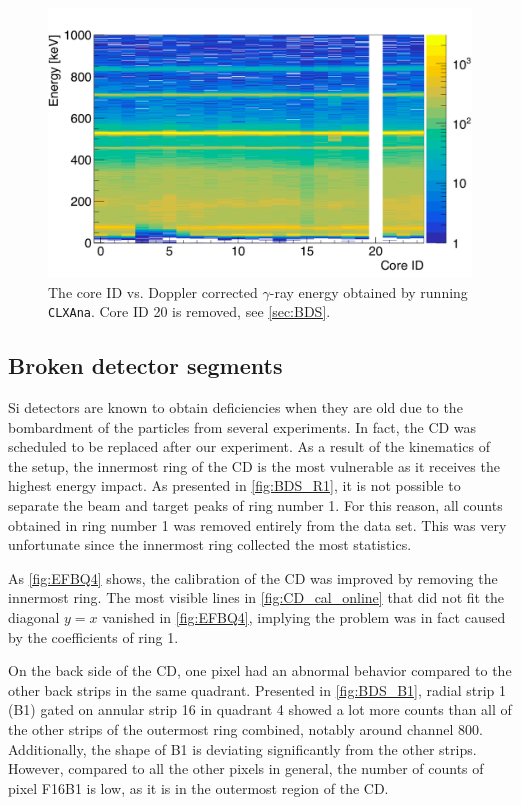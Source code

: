 \documentclass[twoside,english]{uiofysmaster/uiofysmaster}
\newcommand{\ga}{$\gamma$}
\let\orgautoref\autoref
\renewcommand{\autoref}
        {%
		 \def\sectionautorefname{Section}%
		 \def\subsectionautorefname{Section}%
		 \def\subsubsectionautorefname{Section}%
		 \def\chapterautorefname{Chapter}%
          \orgautoref}
\begin{document}
\begin{figure}[ht]
	\centering
	\includegraphics[width=\textwidth]{../Plots/plotting/B_dcB_cid.png}
	\caption{The core ID vs. Doppler corrected \ga-ray energy obtained by running \texttt{CLXAna}. 
	Core ID 20 is removed, see \autoref{sec:BDS}.}
	\label{fig:B_dcB_cid}
\end{figure}


\subsection{Broken detector segments}\label{sec:BDS}
Si detectors are known to obtain deficiencies when they are old due to the bombardment of the particles from several experiments.
In fact, the CD was scheduled to be replaced after our experiment. 
As a result of the kinematics of the setup, the innermost ring of the CD is the most vulnerable as it receives the highest energy impact. 
As presented in \autoref{fig:BDS_R1}, it is not possible to separate the beam and target peaks of ring number 1. 
For this reason, all counts obtained in ring number 1 was removed entirely from the data set.
This was very unfortunate since the innermost ring collected the most statistics.

As \autoref{fig:EFBQ4} shows, the calibration of the CD was improved by removing the innermost ring. 
The most visible lines in \autoref{fig:CD_cal_online} that did not fit the diagonal $y = x$ vanished in \autoref{fig:EFBQ4}, implying the problem was in fact caused by the coefficients of ring 1.

On the back side of the CD, one pixel had an abnormal behavior compared to the other back strips in the same quadrant. 
Presented in \autoref{fig:BDS_B1}, radial strip 1 (B1) gated on annular strip 16 in quadrant 4 showed a lot more counts than all of the other strips of the outermost ring combined, notably around channel 800. 
Additionally, the shape of B1 is deviating significantly from the other strips. 
However, compared to all the other pixels in general, the number of counts of pixel F16B1 is low, as it is in the outermost region of the CD.  
\end{document}
